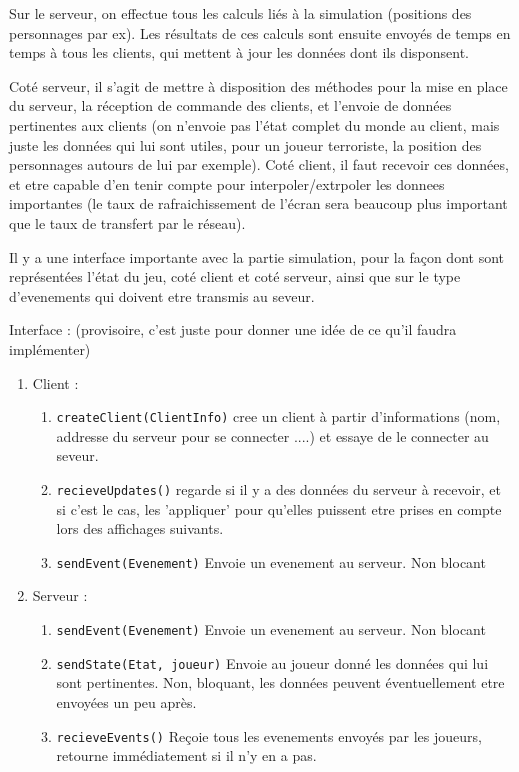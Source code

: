 \documentclass[a4paper,10pt]{article}
\begin{document}
Sur le serveur, on effectue tous les calculs liés à la simulation (positions des personnages par ex). Les résultats de ces calculs sont ensuite envoyés de temps en temps à tous les clients, qui mettent à jour les données dont ils disponsent.

Coté serveur, il s'agit de mettre à disposition des méthodes pour la mise en place du serveur, la réception de commande des clients, et l'envoie de données pertinentes aux clients (on n'envoie pas l'état complet du monde au client, mais juste les données qui lui sont utiles, pour un joueur terroriste, la position des personnages autours de lui par exemple). Coté client, il faut recevoir ces données, et etre capable d'en tenir compte pour interpoler/extrpoler les donnees importantes (le taux de rafraichissement de l'écran sera beaucoup plus important que le taux de transfert par le réseau).

Il y a une interface importante avec la partie simulation, pour la façon dont sont représentées l'état du jeu, coté client et coté serveur, ainsi que sur le type d'evenements qui doivent etre transmis au seveur.

Interface : (provisoire, c'est juste pour donner une idée de ce qu'il faudra implémenter)
\begin{enumerate}
 \item Client : \begin{enumerate}
        \item \verb!createClient(ClientInfo)! cree un client à partir d'informations (nom, addresse du serveur pour se connecter ....) et essaye de le connecter au seveur.
        \item \verb!recieveUpdates()! regarde si il y a des données du serveur à recevoir, et si c'est le cas, les 'appliquer' pour qu'elles puissent etre prises en compte lors des affichages suivants.
        \item \verb!sendEvent(Evenement)! Envoie un evenement au serveur. Non blocant
       \end{enumerate}
\item Serveur : \begin{enumerate}
                 \item \verb!sendEvent(Evenement)! Envoie un evenement au serveur. Non blocant
                 \item \verb!sendState(Etat, joueur)! Envoie au joueur donné les données qui lui sont pertinentes. Non, bloquant, les données peuvent éventuellement etre envoyées un peu après.
                 \item \verb!recieveEvents()! Reçoie tous les evenements envoyés par les joueurs, retourne immédiatement si il n'y en a pas.
                \end{enumerate}

\end{enumerate}
\end{document}
